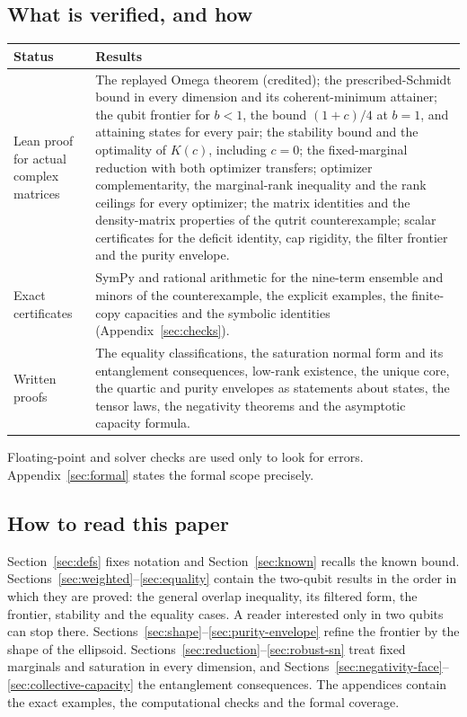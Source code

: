 \documentclass[11pt,a4paper]{article}
\theoremstyle{remark}\newtheorem{remark}[theorem]{Remark}
\begin{document}
\subsection{What is verified, and how}
\begin{center}\small
\begin{tabular}{p{}p{}}\toprule
Status & Results\\\midrule
Lean proof for actual complex matrices &
The replayed Omega theorem (credited); the prescribed-Schmidt bound in every
dimension and its coherent-minimum attainer; the qubit frontier for $b<1$,
the bound $(1+c)/4$ at $b=1$, and attaining states for every pair; the
stability bound and the optimality of $K(c)$, including $c=0$; the
fixed-marginal reduction with both optimizer transfers; optimizer
complementarity, the marginal-rank inequality and the rank ceilings for
every optimizer; the matrix identities and the density-matrix properties of
the qutrit counterexample; scalar certificates for the deficit identity,
cap rigidity, the filter frontier and the purity envelope.\\
Exact certificates &
SymPy and rational arithmetic for the nine-term ensemble and minors of the
counterexample, the explicit examples, the finite-copy capacities and the
symbolic identities (Appendix~\ref{sec:checks}).\\
Written proofs &
The equality classifications, the saturation normal form and its
entanglement consequences, low-rank existence, the unique core, the quartic
and purity envelopes as statements about states, the tensor laws, the
negativity theorems and the asymptotic capacity formula.\\\bottomrule
\end{tabular}
\end{center}
Floating-point and solver checks are used only to look for errors.
Appendix~\ref{sec:formal} states the formal scope precisely.

\subsection{How to read this paper}
Section~\ref{sec:defs} fixes notation and Section~\ref{sec:known} recalls
the known bound. Sections~\ref{sec:weighted}--\ref{sec:equality} contain
the two-qubit results in the order in which they are proved: the general
overlap inequality, its filtered form, the frontier, stability and the
equality cases. A reader interested only in two qubits can stop there.
Sections~\ref{sec:shape}--\ref{sec:purity-envelope} refine the frontier by
the shape of the ellipsoid. Sections~\ref{sec:reduction}--\ref{sec:robust-sn}
treat fixed marginals and saturation in every dimension, and
Sections~\ref{sec:negativity-face}--\ref{sec:collective-capacity} the
entanglement consequences. The appendices contain the exact examples, the
computational checks and the formal coverage.
\end{document}
